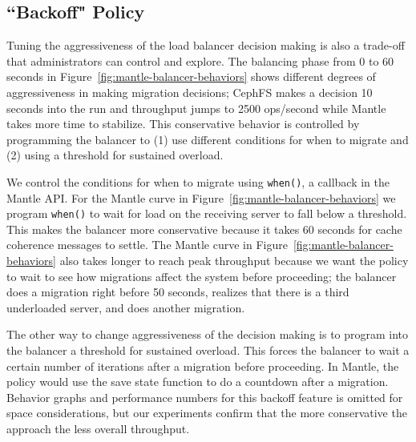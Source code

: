 \subsection{``Backoff" Policy}
\label{sec:feature-backoff}

Tuning the aggressiveness of the load balancer decision making is also a
trade-off that administrators can control and explore. The balancing phase from
0 to 60 seconds in Figure~\ref{fig:mantle-balancer-behaviors} shows different
degrees of aggressiveness in making migration decisions; CephFS makes a
decision 10 seconds into the run and throughput jumps to 2500 ops/second 
while Mantle takes more time to stabilize. This conservative behavior is
controlled by programming the balancer to (1) use different conditions for when
to migrate and (2) using a threshold for sustained overload. 

We control the conditions for when to migrate using \texttt{when()}, a callback
in the Mantle API.  For the Mantle curve in
Figure~\ref{fig:mantle-balancer-behaviors} we program \texttt{when()} to wait
for load on the receiving server to fall below a threshold. This makes the
balancer more conservative because it takes 60 seconds for cache coherence
messages to settle.  The Mantle curve in
Figure~\ref{fig:mantle-balancer-behaviors} also takes longer to reach peak
throughput because we want the policy to wait to see how migrations affect the
system before proceeding; the balancer does a migration right before 50
seconds, realizes that there is a third underloaded server, and does another
migration. 

The other way to change aggressiveness of the decision making is to program
into the balancer a threshold for sustained overload. This forces the balancer
to wait a certain number of iterations after a migration before proceeding. In
Mantle, the policy would use the save state function to do a countdown after a
migration.  Behavior graphs and performance numbers for this backoff feature is
omitted for space considerations, but our experiments confirm that the more
conservative the approach the less overall throughput.
 
